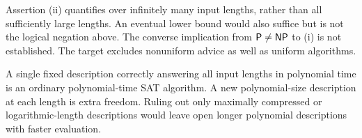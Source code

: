 Assertion (ii) quantifies over infinitely many input lengths, rather
than all sufficiently large lengths. An eventual lower bound would
also suffice but is not the logical negation above.
The converse implication from \(\mathsf{P}\ne\mathsf{NP}\) to (i) is not established.
The target excludes nonuniform advice as well as uniform algorithms.

A single fixed description correctly answering all input lengths in
polynomial time is an ordinary polynomial-time SAT algorithm.
A new polynomial-size description at each length is extra freedom.
Ruling out only maximally compressed or logarithmic-length descriptions
would leave open longer polynomial descriptions with faster evaluation.
